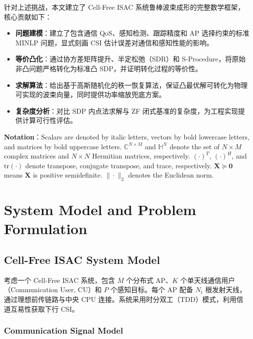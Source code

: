 \documentclass[12pt,a4paper]{article}
\newcommand{\mat}[1]{\mathbf{#1}}
\newcommand{\tr}{\text{tr}}
\begin{document}
针对上述挑战，本文建立了 Cell-Free ISAC 系统鲁棒波束成形的完整数学框架，核心贡献如下：
\begin{itemize}
    \item \textbf{问题建模}：建立了包含通信 QoS、感知检测、跟踪精度和 AP 选择约束的标准 MINLP 问题，显式刻画 CSI 估计误差对通信和感知性能的影响。
    \item \textbf{等价凸化}：通过协方差矩阵提升、半定松弛（SDR）和 S-Procedure，将原始非凸问题严格转化为标准凸 SDP，并证明转化过程的等价性。
    \item \textbf{求解算法}：给出基于高斯随机化的秩一恢复算法，保证凸最优解可转化为物理可实现的波束向量，同时提供功率缩放兜底方案。
    \item \textbf{复杂度分析}：对比 SDP 内点法求解与 ZF 闭式基准的复杂度，为工程实现提供计算可行性评估。
\end{itemize}

\textbf{Notation}：Scalars are denoted by italic letters, vectors by bold lowercase letters, and matrices by bold uppercase letters. $\mathbb{C}^{N \times M}$ and $\mathbb{H}^N$ denote the set of $N \times M$ complex matrices and $N \times N$ Hermitian matrices, respectively. $(\cdot)^T$, $(\cdot)^H$, and $\tr(\cdot)$ denote transpose, conjugate transpose, and trace, respectively. $\mat{X} \succeq \mat{0}$ means $\mat{X}$ is positive semidefinite. $\|\cdot\|_2$ denotes the Euclidean norm.

\section{System Model and Problem Formulation}

\subsection{Cell-Free ISAC System Model}

考虑一个 Cell-Free ISAC 系统，包含 $M$ 个分布式 AP、$K$ 个单天线通信用户（Communication User, CU）和 $P$ 个感知目标。每个 AP 配备 $N_t$ 根发射天线，通过理想前传链路与中央 CPU 连接。系统采用时分双工（TDD）模式，利用信道互易性获取下行 CSI。

\subsubsection{Communication Signal Model}
\end{document}
